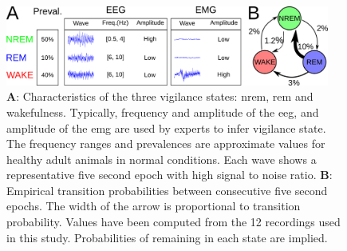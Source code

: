 \begin{figure}[h!]
  \centering   
    \includegraphics[width=0.95\textwidth]{figures/sleep_description.pdf}
  \caption{
  \textbf{A}: Characteristics of the three vigilance states: \gls{nrem}, \gls{rem} and wakefulness.
  Typically, frequency and amplitude of the \acrfull{eeg}, and amplitude of the \acrfull{emg} are used by experts to infer vigilance state.
  The frequency ranges and prevalences are approximate values for healthy adult animals in normal conditions.
  Each wave shows a representative five second epoch with high signal to noise ratio.
  \textbf{B}: Empirical transition probabilities between consecutive five second epochs. 
  The width of the arrow is proportional to transition probability.
  Values have been computed from the 12 recordings used in this study.
  Probabilities of remaining in each state are implied.
  \label{fig:sleep_description}
  }
\end{figure}


